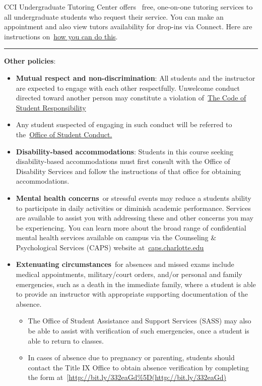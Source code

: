 \documentclass[
]{article}
\providecommand{\tightlist}{%
  \setlength{\itemsep}{0pt}\setlength{\parskip}{0pt}}
\begin{document}
CCI Undergraduate Tutoring Center offers ~free, one-on-one tutoring
services to all undergraduate students who request their service. You
can make an appointment and also view tutors\textquotesingle{}
availability for drop-ins via Connect. Here are instructions
on~\href{https://cci.charlotte.edu/student-life/tutoring}{how you can do
this}.~

\begin{center}\rule{0.5\linewidth}{0.5pt}\end{center}

\textbf{Other policies}:

\begin{itemize}
\tightlist
\item
  \textbf{Mutual respect and non-discrimination}: All students and the
  instructor are expected to engage with each other respectfully.
  Unwelcome conduct directed toward another person may constitute a
  violation of~\href{https://legal.uncc.edu/policies/up-406}{The Code of
  Student Responsibility}
\item
  Any student suspected of engaging in such conduct will be referred to
  the~\href{https://scai.uncc.edu/}{Office of Student Conduct.}
\item
  \textbf{Disability-based accommodations}: Students in this course
  seeking disability-based accommodations must first consult with the
  Office of Disability Services and follow the instructions of that
  office for obtaining accommodations.
\item
  \textbf{Mental health concerns}~or stressful events may reduce a
  student\textquotesingle s ability to participate in daily activities
  or diminish academic performance. Services are available to assist you
  with addressing these and other concerns you may be experiencing. You
  can learn more about the broad range of confidential mental health
  services available on campus via the Counseling \& Psychological
  Services (CAPS) website
  at~\href{http://caps.uncc.edu/}{caps.charlotte.edu}
\item
  \textbf{Extenuating circumstances}~for absences and missed exams
  include medical appointments, military/court orders, and/or personal
  and family emergencies, such as a death in the immediate family, where
  a student is able to provide an instructor with appropriate supporting
  documentation of the absence.

  \begin{itemize}
  \tightlist
  \item
    The Office of Student Assistance and Support Services (SASS) may
    also be able to assist with verification of such emergencies, once a
    student is able to return to classes.
  \item
    In cases of absence due to pregnancy or parenting, students should
    contact the Title IX Office to obtain absence verification by
    completing the form
    at~{[}\url{http://bit.ly/332eaGd\%5D(http://bit.ly/332eaGd)}
  \end{itemize}
\end{itemize}
\end{document}

